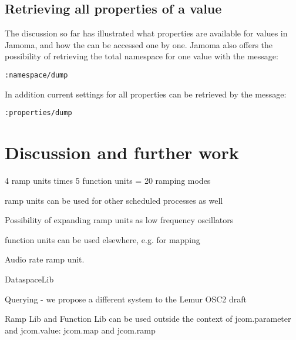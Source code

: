 \documentclass{sig-alternate}
\begin{document}

\subsection{Retrieving all properties of a value} %
\label{sub:retrieving_all_properties_of_a_value}

The discussion so far has illustrated what properties are available for values in Jamoma, and how the can be accessed one by one. Jamoma also offers the possibility of retrieving the total namespace for one value with the message: 

\texttt{:namespace/dump}

In addition current settings for all properties can be retrieved by the message:

\texttt{:properties/dump}






\section{Discussion and further work} %
\label{sec:discussion_and_further_work}

4 ramp units times 5 function units = 20 ramping modes

ramp units can be used for other scheduled processes as well

Possibility of expanding ramp units as low frequency oscillators

function units can be used elsewhere, e.g. for mapping

Audio rate ramp unit.

DataspaceLib

Querying - we propose a different system to the Lemur OSC2 draft

Ramp Lib and Function Lib can be used outside the context of jcom.parameter and jcom.value: jcom.map and jcom.ramp







\end{document}
